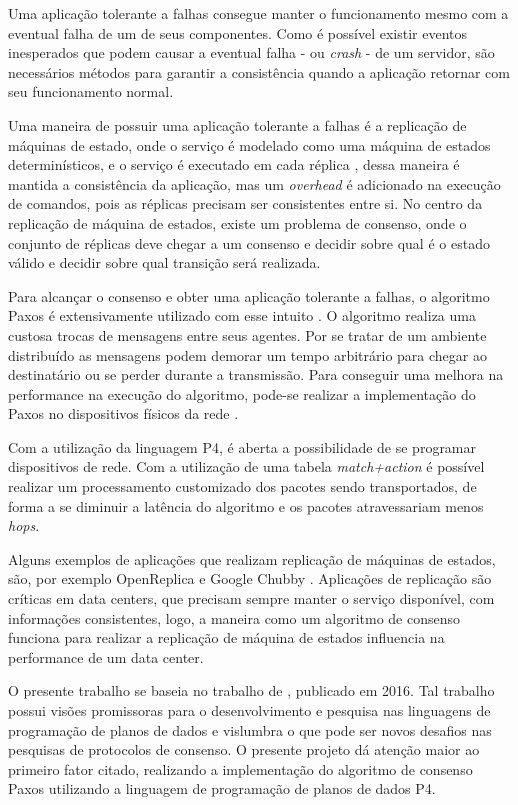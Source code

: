 \documentclass[
    12pt,
    openright, 
    oneside,
    a4paper,
    french,
    english,
    brazil
    ]{facom-ufu-abntex2}
\theoremstyle{definition}
\begin{document}
Uma aplicação tolerante a falhas consegue manter o funcionamento mesmo com a eventual 
falha de um de seus componentes. Como é possível existir eventos inesperados que podem
causar a eventual falha - ou \textit{crash} - de um servidor, são necessários métodos
para garantir a consistência quando a aplicação retornar com seu funcionamento
normal. 

Uma maneira de possuir uma aplicação tolerante a falhas é a replicação de máquinas
de estado, onde o serviço é modelado como uma máquina de estados determinísticos, e o
serviço é executado em cada réplica \cite{santos2012state}, dessa maneira é mantida
a consistência da aplicação, mas um \textit{overhead} é adicionado na execução
de comandos, pois as réplicas precisam ser consistentes entre si. No centro da replicação
de máquina de estados, existe um problema de consenso, onde o conjunto de réplicas deve 
chegar a um consenso e decidir sobre qual é o estado válido e decidir sobre qual 
transição será realizada. 

Para alcançar o consenso e obter uma aplicação tolerante a falhas, o algoritmo
Paxos é extensivamente utilizado com esse intuito \cite{dang2016paxos}. 
O algoritmo realiza uma custosa trocas de mensagens entre seus agentes. Por se 
tratar de um ambiente distribuído as mensagens podem demorar um tempo arbitrário 
para chegar ao destinatário ou se perder durante a transmissão. Para conseguir 
uma melhora na performance na execução do algoritmo, pode-se realizar a 
implementação do Paxos no dispositivos físicos da rede \cite{dang2016paxos}.

Com a utilização da linguagem P4, é aberta a possibilidade de se programar dispositivos
de rede. Com a utilização de uma tabela \textit{match+action} é possível 
realizar um processamento customizado dos pacotes sendo transportados, de forma a
se diminuir a latência do algoritmo e os pacotes atravessariam menos \textit{hops}.

Alguns exemplos de aplicações que realizam replicação de máquinas de estados, são,
por exemplo OpenReplica \cite{openreplica} e Google Chubby \cite{27897}. Aplicações
de replicação são críticas em data centers, que precisam sempre manter o serviço 
disponível, com informações consistentes, logo, a maneira como um algoritmo de consenso
funciona para realizar a replicação de máquina de estados influencia na performance 
de um data center.

O presente trabalho se baseia no trabalho de \cite{dang2016paxos}, publicado
em 2016. Tal trabalho possui visões promissoras para o desenvolvimento
e pesquisa nas linguagens de programação de planos de dados e vislumbra o que pode ser
novos desafios nas pesquisas de protocolos de consenso. O presente projeto dá atenção maior
ao primeiro fator citado, realizando a implementação do algoritmo de consenso Paxos utilizando
a linguagem de programação de planos de dados P4.
\end{document}
